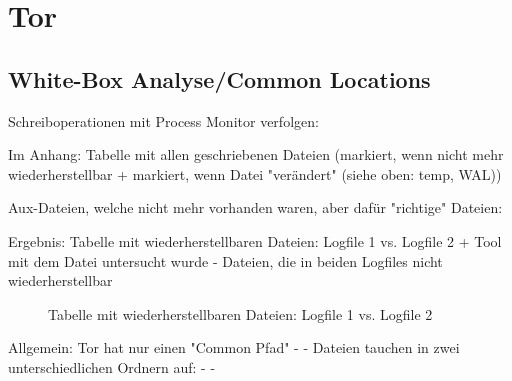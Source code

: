 \newpage




\section{Tor}

\subsection*{White-Box Analyse/Common Locations}

Schreiboperationen mit Process Monitor verfolgen:

Im Anhang: Tabelle mit allen geschriebenen Dateien (markiert, wenn nicht mehr wiederherstellbar + markiert, wenn Datei "verändert" (siehe oben: temp, WAL))

Aux-Dateien, welche nicht mehr vorhanden waren, aber dafür "richtige" Dateien:

Ergebnis: Tabelle mit wiederherstellbaren Dateien: Logfile 1 vs. Logfile 2 + Tool mit dem Datei untersucht wurde
- Dateien, die in beiden Logfiles nicht wiederherstellbar 
\begin{figure}[h!]
	\caption{Tabelle mit wiederherstellbaren Dateien: Logfile 1 vs. Logfile 2}
\end{figure}

Allgemein: Tor hat nur einen "Common Pfad"
-	%
- Dateien tauchen in zwei unterschiedlichen Ordnern auf:
	- %
	- %

